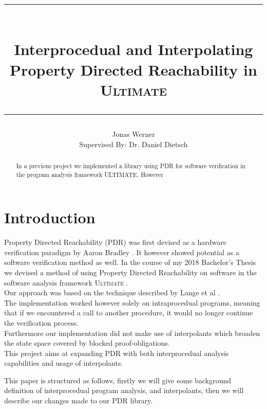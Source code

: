 \documentclass{article}
\newcommand\mycom[1]{}
\newcommand\mycom[1]{#1}
\newcommand{\jw}[1]{\mycom{\todo[color=blue!40,inline]{\small JW: #1}}}
\begin{document}
	\newcommand{\HorizontalLine}{\rule{\linewidth}{0.3mm}}
	
	\title{ \HorizontalLine \\ \textbf{Interprocedual and Interpolating \\ Property Directed Reachability in \textsc{Ultimate}} \HorizontalLine}
	

	
	\author{Jonas Werner \\ Supervised By: Dr. Daniel Dietsch}


	
	\date{} 
	
	\maketitle
	
	\begin{abstract}
	In a previous project we implemented a library using PDR for software verification in the program analysis framework ULTIMATE. However \jw{...}
	\end{abstract}
	
	
	\section{Introduction}
	
	Property Directed Reachability (PDR) was first devised as a hardware verification paradigm by Aaron Bradley \cite{DBLP:conf/vmcai/Bradley11}. It however showed potential as a software verification method as well.
	In the course of my 2018 Bachelor's Thesis we devised a method of using Property Directed Reachability on software in the software analysis framework \textsc{Ultimate} \cite{Zitat02}. \\
	Our approach was based on the technique described by Lange et al \cite{DBLP:conf/date/WelpK13}. \\ The implementation worked however solely on intraprocedual programs, meaning that if we encountered a call to another procedure, it would no longer continue the verification process. \\
	Furthermore our implementation did not make use of interpolants which broaden the state space covered by blocked proof-obligations. \\
	This project aims at expanding PDR with both interprocedual analysis capabilities and usage of interpolants. \jw{\textbf{Both kinds of interpolants: Craig and selfless (citation needed)}} \par
    This paper is structured as follows, firstly we will give some background definition of interprocedual program analysis, and interpolants, then we will describe our changes made to our PDR library.
	
\end{document}
